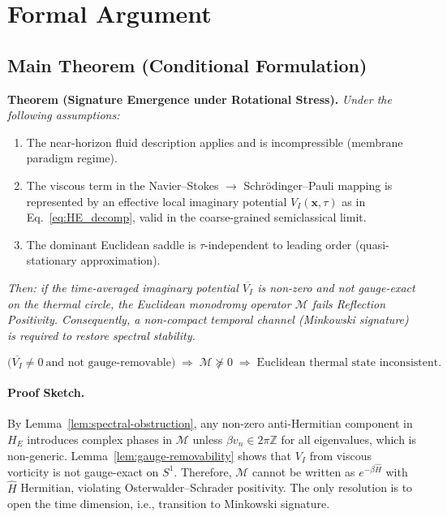 \documentclass[11pt]{article}
\begin{document}
\section{Formal Argument}

\subsection{Main Theorem (Conditional Formulation)}

\textbf{Theorem (Signature Emergence under Rotational Stress).}
\emph{Under the following assumptions:}
\begin{enumerate}[label=(\Alph*)]
    \item The near-horizon fluid description applies and is incompressible (membrane paradigm regime).
    \item The viscous term in the Navier–Stokes $\to$ Schr\"odinger–Pauli mapping is represented by an effective local imaginary potential $V_I(\mathbf{x},\tau)$ as in Eq.~\eqref{eq:HE_decomp}, valid in the coarse-grained semiclassical limit.
    \item The dominant Euclidean saddle is $\tau$-independent to leading order (quasi-stationary approximation).
\end{enumerate}
\emph{Then: if the time-averaged imaginary potential $\overline{V_I}$ is non-zero and not gauge-exact on the thermal circle, the Euclidean monodromy operator $\mathcal{M}$ fails Reflection Positivity. Consequently, a non-compact temporal channel (Minkowski signature) is required to restore spectral stability.}

\begin{equation}
\boxed{
\big( \overline{V_I} \neq 0 \ \text{and not gauge-removable} \big)
\;\Longrightarrow\;
\mathcal{M} \not\succeq 0
\;\Longrightarrow\;
\text{Euclidean thermal state inconsistent.}
}
\end{equation}

\paragraph{Proof Sketch.}
By Lemma~\ref{lem:spectral-obstruction}, any non-zero anti-Hermitian component in $H_E$ introduces complex phases in $\mathcal{M}$ unless $\beta v_n \in 2\pi\mathbb{Z}$ for all eigenvalues, which is non-generic. Lemma~\ref{lem:gauge-removability} shows that $V_I$ from viscous vorticity is not gauge-exact on $S^1$. Therefore, $\mathcal{M}$ cannot be written as $e^{-\beta \widehat{H}}$ with $\widehat{H}$ Hermitian, violating Osterwalder–Schrader positivity. The only resolution is to open the time dimension, i.e., transition to Minkowski signature.
\end{document}

